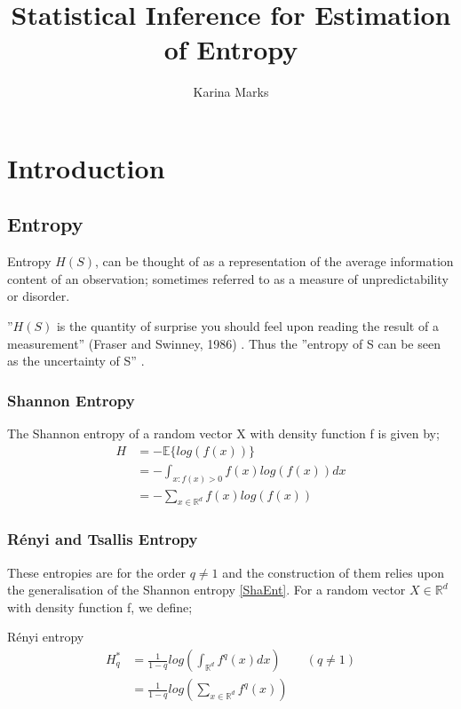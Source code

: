 \documentclass{report}
\title{Statistical Inference for Estimation of Entropy}
\author{Karina Marks}
\begin{document}
\begin{titlepage}
\maketitle
\end{titlepage}

\tableofcontents

\chapter{Introduction} 

\section{Entropy}

Entropy $H(S)$, can be thought of as a representation of the average information content of an observation; sometimes referred to as a measure of unpredictability or disorder. 

''$H(S)$ is the quantity of surprise you should feel upon reading the result of a measurement'' (Fraser and Swinney, 1986) \cite{entdef}. Thus the ''entropy of S can be seen as the uncertainty of S'' \cite{paper7}.

\subsection{Shannon Entropy}
The Shannon entropy of a random vector X with density function f is given by;
\begin{align} 
H &= - \mathbb{E} \{log(f(x))\} \nonumber \\
&= - \int_{x : f(x) > 0} f(x) log(f(x)) dx \nonumber \\
&= - \sum_{x \in \mathbb{R}^{d}} f(x) log(f(x)) \label{ShaEnt}
\end{align} 

\subsection{R\'enyi and Tsallis Entropy}
These entropies are for the order $q \neq 1$ and the construction of them relies upon the generalisation of the Shannon entropy \ref{ShaEnt}. For a random vector $X \in \mathbb{R}^d$ with density function f, we define;

R\'enyi entropy
\begin{align} 
H_{q}^{*} &= \frac{1}{1-q} log \left( \int_{\mathbb{R}^d} f^q (x) dx \right) \quad  \quad (q \neq 1) \label{RenEnt} \\
&=  \frac{1}{1-q} log \left( \sum_{x \in \mathbb{R}^{d}} f^q (x) \right) \nonumber 
\end{align}
\end{document}
